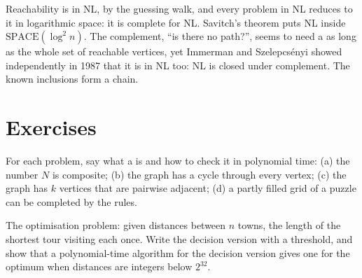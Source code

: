 Reachability is in NL, by the guessing walk, and every problem in NL reduces to it in logarithmic space: it is complete for NL. Savitch's theorem puts NL inside $\mathrm{SPACE}(\log^2 n)$. The complement, ``is there no path?'', seems to need a  as long as the whole set of reachable vertices, yet Immerman and Szelepcsényi showed independently in 1987 that it is in NL too: NL is closed under complement. %
The known inclusions form a chain.

\begin{omfigure}
\par{}
\end{omfigure}

\section{Exercises}\label{sec:b3:complexity-classes:exercises}

\begin{exercise}[$\star$]\label{exo:b3:complexity-classes:1}
For each problem, say what a  is and how to check it in polynomial time: (a) the number $N$ is composite; (b) the graph has a cycle through every vertex; (c) the graph has $k$ vertices that are pairwise adjacent; (d) a partly filled grid of a puzzle can be completed by the rules.
\end{exercise}

\begin{exercise}[$\star$]\label{exo:b3:complexity-classes:2}
The optimisation problem: given distances between $n$ towns, the length of the shortest tour visiting each once. Write the decision version with a threshold, and show that a polynomial-time algorithm for the decision version gives one for the optimum when distances are integers below $2^{32}$.
\end{exercise}

